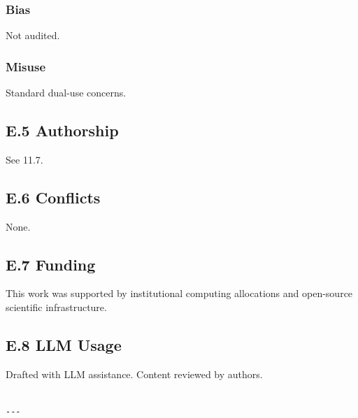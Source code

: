 \subsubsection{Bias}
Not audited.

\subsubsection{Misuse}
Standard dual-use concerns.

\subsection{E.5 Authorship}

See  11.7.

\subsection{E.6 Conflicts}

None.

\subsection{E.7 Funding}

This work was supported by institutional computing allocations and open-source scientific infrastructure.

\subsection{E.8 LLM Usage}

Drafted with LLM assistance. Content reviewed by authors.
\begin{lstlisting}

---
\end{lstlisting}